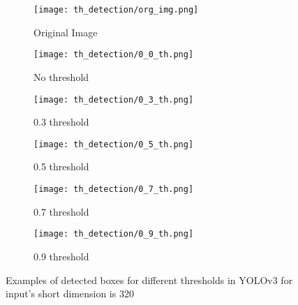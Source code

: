 \documentclass{article}
\begin{document}
\begin{figure}
    \begin{subfigure}{0.30\textwidth}%
        \centering
        \texttt{[image: th\_detection/org\_img.png]}
        \caption{Original Image}
        \label{fig:sfig1}
    \end{subfigure}     
    \begin{subfigure}{0.30\textwidth}%
        \centering
        \texttt{[image: th\_detection/0\_0\_th.png]}
        \caption{No threshold}
        \label{fig:sfig2}
    \end{subfigure}
    \begin{subfigure}{0.30\textwidth}%
        \centering
        \texttt{[image: th\_detection/0\_3\_th.png]}
        \caption{0.3 threshold}
        \label{fig:sfig3}
    \end{subfigure}


    
    \begin{subfigure}{0.30\textwidth}%
        \centering
        \texttt{[image: th\_detection/0\_5\_th.png]}
        \caption{0.5 threshold}
        \label{fig:sfig4}
    \end{subfigure}
    \begin{subfigure}{0.30\textwidth}%
        \centering
        \texttt{[image: th\_detection/0\_7\_th.png]}
        \caption{0.7 threshold}
        \label{fig:sfig5}
    \end{subfigure}
    \begin{subfigure}{0.30\textwidth}%
        \centering
        \texttt{[image: th\_detection/0\_9\_th.png]}
        \caption{0.9 threshold}
        \label{fig:sfig6}
    \end{subfigure}
    \caption{Examples of detected boxes for different thresholds in YOLOv3 for input's short dimension is 320}
    \label{fig:exp_imgs}
\end{figure}
\end{document}

